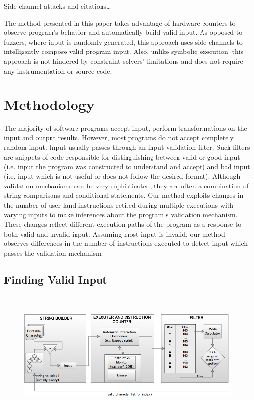 \documentclass[10pt,twocolumn]{article}
\begin{document}
Side channel attacks and citations\ldots

The method presented in this paper takes advantage of hardware counters to observe program's behavior and automatically build valid input.
As opposed to fuzzers, where input is randomly generated, this approach uses side channels to intelligently compose valid program input.
Also, unlike symbolic execution, this approach is not hindered by constraint solvers' limitations and does not require any instrumentation or source code.

\section{Methodology} \label{methodology}

The majority of software programs accept input, perform transformations on the input and output results.
However, most programs do not accept completely random input.
Input usually passes through an input validation filter.
Such filters are snippets of code responsible for distinguishing between valid or good input (i.e. input the program was constructed to understand and accept) and bad input (i.e. input which is not useful or does not follow the desired format).
Although validation mechanisms can be very sophisticated, they are often a combination of string comparisons and conditional statements.
Our method exploits changes in the number of user-land instructions retired during multiple executions with varying inputs to make inferences about the program's validation mechanism.
These changes reflect different execution paths of the program as a response to both valid and invalid input.
Assuming most input is invalid, our method observes differences in the number of instructions executed to detect input which passes the validation mechanism.


\subsection{Finding Valid Input}

\begin{figure}[t]
\centering
\includegraphics[height=2.5in,width=6.5in]{architecture.png}
\label{fig:architecture}
\caption{}
\end{figure}
\end{document}
